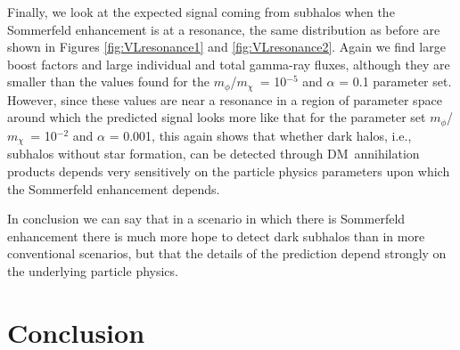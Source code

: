 \documentclass[aps,prd,twocolumn,amsmath,amssymb,floatfix,nofootinbib,10pt]{revtex4}
\newcommand{\ie}{i.e.}
\newcommand{\DM}{DM}
\newcommand{\mdm}{\ensuremath{m_{\chi}}}
\newcommand{\mv}{\ensuremath{m_{\phi}}}
\begin{document}
Finally, we look at the expected signal coming from subhalos when the
Sommerfeld enhancement is at a resonance, the same distribution as
before are shown in Figures \ref{fig:VLresonance1} and
\ref{fig:VLresonance2}. Again we find large boost factors and large
individual and total gamma-ray fluxes, although they are smaller than
the values found for the \mv/\mdm\ = 10$^{-5}$ and $\alpha$ = 0.1
parameter set. However, since these values are near a resonance in a
region of parameter space around which the predicted signal looks more
like that for the parameter set \mv/\mdm\ = 10$^{-2}$ and $\alpha$ =
0.001, this again shows that whether dark halos, \ie, subhalos without
star formation, can be detected through \DM\ annihilation products
depends very sensitively on the particle physics parameters upon which
the Sommerfeld enhancement depends.

In conclusion we can say that in a scenario in which there is
Sommerfeld enhancement there is much more hope to detect dark subhalos
than in more conventional scenarios, but that the details of the
prediction depend strongly on the underlying particle physics.

\section{Conclusion}
\end{document}
